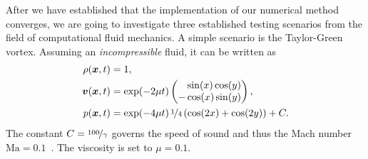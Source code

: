 \documentclass[runningheads]{llncs}
\begin{document}
After we have established that the implementation of our numerical method converges, we are going to investigate three established testing scenarios from the field of computational fluid mechanics.
A simple scenario is the Taylor-Green vortex.
Assuming an \textit{incompressible} fluid, it can be written as
\begin{align}
  \label{eq:taylor-green}
  \begin{split}
  \rho(\bm{x}, t) &= 1,\\
  \bm{v}(\bm{x}, t) &= \exp(-2 \mu t)
  \begin{pmatrix}
    \phantom{-}\sin(x) \cos(y) \\
- \cos(x) \sin(y) 
    \end{pmatrix}, \\
  p(\bm{x}, t) &= \exp(-4 \mu t) \, \nicefrac{1}{4} \left( \cos(2x) + \cos(2y) \right) + C.
  \end{split}
\end{align}
The constant $C = \nicefrac{100}{\gamma}$ governs the speed of sound and thus the Mach number $\text{Ma} = 0.1$~\cite{dumbser2016high}.
The viscosity is set to $\mu = 0.1$. 
\end{document}

